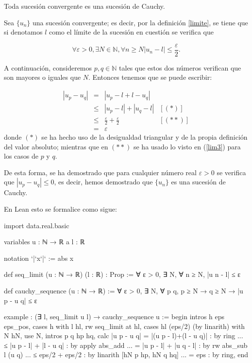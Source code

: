 \begin{teorema}
  Toda sucesión convergente es una sucesión de Cauchy.
\end{teorema}
\begin{demostracion}
  Sea \(\{u_n\}\) una sucesión convergente; es decir, por la definición
  \ref{limite}, se tiene que si denotamos \(l\) como el límite de la
  sucesión en cuestión se verifica que

  \begin{equation}\label{lim3}
  ∀ ε > 0, ∃ N ∈ ℕ, ∀ n ≥ N |u_n-l| ≤ \frac{ε}{2}.
  \end{equation}

  A continuación, consideremos \(p,q ∈ ℕ\) tales que estos dos números
  verifican que son mayores o iguales que \(N\). Entonces tenemos que se
  puede escribir:


  \[\begin{array}{llll}
          |u_p-u_q| &= &|u_p-l+l-u_q|   & \\
                   &≤ &|u_p-l|+|u_q-l| & [(*)] \\
                   &≤ &\frac{ε}{2}+\frac{ε}{2} & [(**)] \\
                   &= &ε
  \end{array}\]
  donde \( (*) \) se ha hecho uso de la desigualdad triangular y de
  la propia definición del valor absoluto; mientras que en \((**)\)
  se ha usado lo visto en (\ref{lim3}) para los casos de \(p\) y \(q\).

  De esta forma, se ha demostrado que para cualquier número real \(ε >0\)
  se verifica que \(|u_p-u_q| ≤ 0\), es decir, hemos demostrado
  que \(\{u_n\}\) es una sucesión de Cauchy.
\end{demostracion}

En Lean esto se formalice como sigue:
\begin{leancode}
import data.real.basic

variables {u : ℕ → ℝ} {a l : ℝ}

notation `|`x`|` := abs x

def seq_limit (u : ℕ → ℝ) (l : ℝ) : Prop :=
∀ ε > 0, ∃ N, ∀ n ≥ N, |u n - l| ≤ ε

def cauchy_sequence (u : ℕ → ℝ) :=
∀ ε > 0, ∃ N, ∀ p q, p ≥ N → q ≥ N → |u p - u q| ≤ ε

example : (∃ l, seq_limit u l) → cauchy_sequence u :=
begin
intros h eps eps_pos,
cases h with l hl,
rw seq_limit at hl,
cases hl (eps/2) (by linarith) with N hN,
use N,
  intros p q hp hq,
calc  |u p - u q|
    = |(u p - l)+(l - u q)|  : by ring
... ≤ |u p - l| + |l - u q|  : by apply abs_add
... = |u p - l| + |u q - l|  : by rw abs_sub l (u q)
... ≤ eps/2 + eps/2          : by linarith [hN p hp, hN q hq]
... = eps                    : by ring,
end
\end{leancode}

